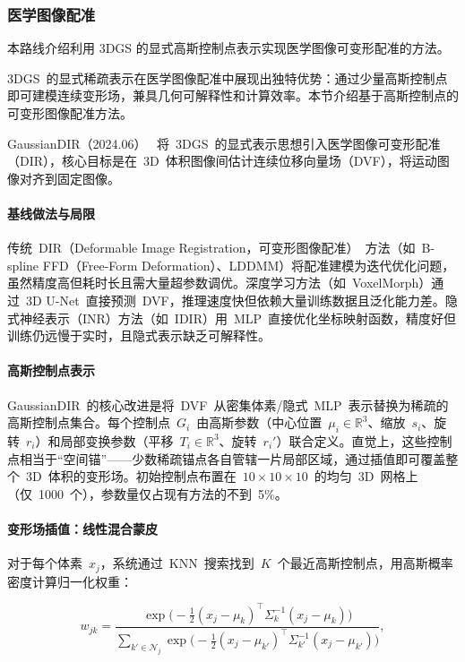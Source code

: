 \subsubsection{医学图像配准}

本路线介绍利用 3DGS 的显式高斯控制点表示实现医学图像可变形配准的方法。

3DGS~的显式稀疏表示在医学图像配准中展现出独特优势：通过少量高斯控制点即可建模连续变形场，兼具几何可解释性和计算效率。本节介绍基于高斯控制点的可变形图像配准方法。

GaussianDIR（2024.06）~\cite{2406_03394} 将~3DGS~的显式表示思想引入医学图像可变形配准（DIR），核心目标是在~3D~体积图像间估计连续位移向量场（DVF），将运动图像对齐到固定图像。

\paragraph{基线做法与局限}
传统~DIR（Deformable Image Registration，可变形图像配准）~方法（如~B-spline FFD（Free-Form Deformation）、LDDMM）将配准建模为迭代优化问题，虽然精度高但耗时长且需大量超参数调优。深度学习方法（如~VoxelMorph）通过~3D U-Net~直接预测~DVF，推理速度快但依赖大量训练数据且泛化能力差。隐式神经表示（INR）方法（如~IDIR）用~MLP~直接优化坐标映射函数，精度好但训练仍远慢于实时，且隐式表示缺乏可解释性。

\paragraph{高斯控制点表示}
GaussianDIR~的核心改进是将~DVF~从密集体素/隐式~MLP~表示替换为稀疏的高斯控制点集合。每个控制点~$G_i$~由高斯参数（中心位置~$\mu_i \in \mathbb{R}^3$、缩放~$s_i$、旋转~$r_i$）和局部变换参数（平移~$T_i \in \mathbb{R}^3$、旋转~$r_i'$）联合定义。直觉上，这些控制点相当于``空间锚''——少数稀疏锚点各自管辖一片局部区域，通过插值即可覆盖整个~3D~体积的变形场。初始控制点布置在~$10 \times 10 \times 10$~的均匀~3D~网格上（仅~1000~个），参数量仅占现有方法的不到~5\%。

\paragraph{变形场插值：线性混合蒙皮}
对于每个体素~$x_j$，系统通过~KNN~搜索找到~$K$~个最近高斯控制点，用高斯概率密度计算归一化权重：

\begin{equation}
w_{jk} = \frac{\exp\bigl(-\tfrac{1}{2}(x_j - \mu_k)^\top \Sigma_k^{-1}(x_j - \mu_k)\bigr)}{\sum_{k' \in \mathcal{N}_j} \exp\bigl(-\tfrac{1}{2}(x_j - \mu_{k'})^\top \Sigma_{k'}^{-1}(x_j - \mu_{k'})\bigr)},
\end{equation}

